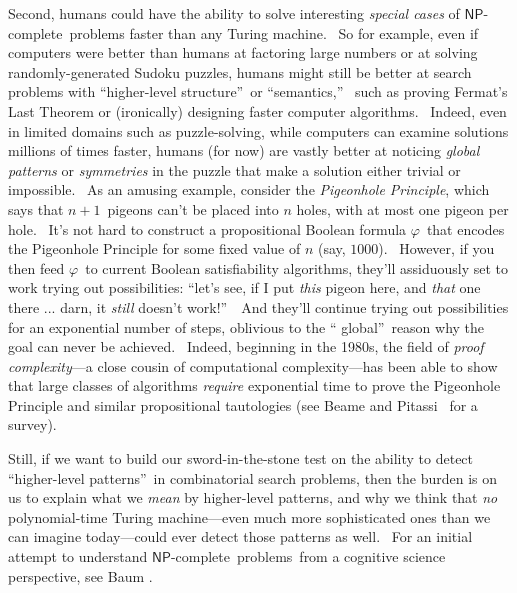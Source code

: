 \documentclass[11pt,onecolumn]{article}%
\begin{document}
Second, humans could have the ability to solve interesting \textit{special
cases} of $\mathsf{NP}$-complete\ problems faster than any Turing machine.
\ So for example, even if computers were better than humans at factoring large
numbers or at solving randomly-generated Sudoku puzzles, humans might still be
better at search problems with \textquotedblleft higher-level
structure\textquotedblright\ or \textquotedblleft semantics,\textquotedblright%
\ such as proving Fermat's Last Theorem or (ironically) designing faster
computer algorithms. \ Indeed, even in limited domains such as puzzle-solving,
while computers can examine solutions millions of times faster, humans (for
now) are vastly better at noticing \textit{global patterns} or
\textit{symmetries} in the puzzle that make a solution either trivial or
impossible. \ As an amusing example, consider the \textit{Pigeonhole
Principle}, which says that $n+1$\ pigeons can't be placed into $n$ holes,
with at most one pigeon per hole. \ It's not hard to construct a propositional
Boolean formula $\varphi$\ that encodes the Pigeonhole Principle for some
fixed value of $n$ (say, $1000$). \ However, if you then feed $\varphi$\ to
current Boolean satisfiability algorithms, they'll assiduously set to work
trying out possibilities: \textquotedblleft let's see, if I put \textit{this}
pigeon here, and \textit{that} one there ... darn, it \textit{still} doesn't
work!\textquotedblright\ \ And they'll continue trying out possibilities for
an exponential number of steps, oblivious to the \textquotedblleft
global\textquotedblright\ reason why the goal can never be achieved. \ Indeed,
beginning in the 1980s, the field of \textit{proof complexity}---a close
cousin of computational complexity---has been able to show that large classes
of algorithms \textit{require} exponential time to prove the Pigeonhole
Principle and similar propositional tautologies (see Beame and Pitassi
\cite{beamepitassi}\ for a survey).

Still, if we want to build our sword-in-the-stone test on the ability to
detect \textquotedblleft higher-level patterns\textquotedblright\ in
combinatorial search problems, then the burden is on us to explain what we
\textit{mean} by higher-level patterns, and why we think that \textit{no}
polynomial-time Turing machine---even much more sophisticated ones than we can
imagine today---could ever detect those patterns as well. \ For an initial
attempt to understand $\mathsf{NP}$-complete\ problems\ from a cognitive
science perspective, see Baum \cite{baum}.
\end{document}
